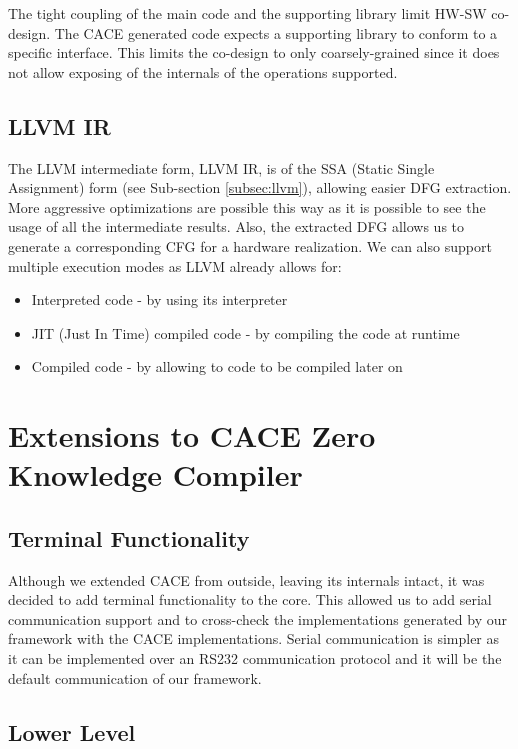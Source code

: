 The tight coupling of the main code and the supporting library limit
HW-SW co-design. The CACE generated code expects a supporting library
to conform to a specific interface. This limits the co-design to only
coarsely-grained since it does not allow exposing of the internals of
the operations supported.

\subsection{LLVM IR}

The LLVM intermediate form, LLVM IR, is of the SSA (Static Single
Assignment) form (see Sub-section \ref{subsec:llvm}), allowing easier
DFG extraction. More aggressive optimizations are possible this way as
it is possible to see the usage of all the intermediate results. Also,
the extracted DFG allows us to generate a corresponding CFG for a
hardware realization. We can also support multiple execution modes as
LLVM already allows for:
\begin{itemize}
\item Interpreted code - by using its interpreter
\item JIT (Just In Time) compiled code - by compiling the code at runtime
\item Compiled code - by allowing to code to be compiled later on
\end{itemize}

\section{Extensions to CACE Zero Knowledge Compiler}
\label{sec:cace_extensions}

\subsection{Terminal Functionality}

Although we extended CACE from outside, leaving its internals intact,
it was decided to add terminal functionality to the core. This allowed
us to add serial communication support and to cross-check the
implementations generated by our framework with the CACE
implementations. Serial communication is simpler as it can be
implemented over an RS232 communication protocol and it will be the
default communication of our framework.

\subsection{Lower Level}

